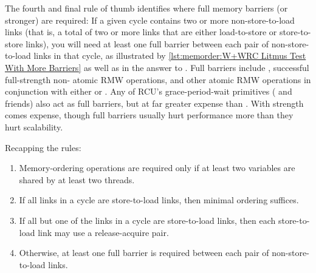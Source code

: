 \QuickQuizEnd

The fourth and final rule of thumb identifies where full memory barriers
(or stronger) are required:
If a given cycle contains two or more non-store-to-load links (that is, a
total of two or more links that are either load-to-store or store-to-store
links), you will need at least one full barrier between each pair of
non-store-to-load links in that cycle, as illustrated by
\cref{lst:memorder:W+WRC Litmus Test With More Barriers}
as well as in the answer to
\QuickQuizARef{\MemorderQQLitmusTestR}.
Full barriers include , successful full-strength non-
atomic RMW operations, and other atomic RMW operations in conjunction with
either  or .
Any of RCU's grace-period-wait primitives ( and
friends) also act as full barriers, but at far greater expense than
.
With strength comes expense, though full barriers
usually hurt performance more than they hurt scalability.

Recapping the rules:

\begin{enumerate}
\item	Memory-ordering operations are required only if at least
	two variables are shared by at least two threads.
\item	If all links in a cycle are store-to-load links, then
	minimal ordering suffices.
\item	If all but one of the links in a cycle are store-to-load links,
	then each store-to-load link may use a release-acquire pair.
\item	Otherwise, at least one full barrier is required between
	each pair of non-store-to-load links.
\end{enumerate}

